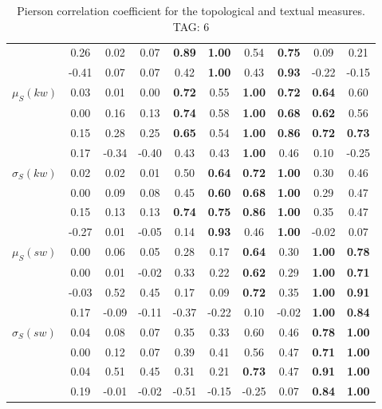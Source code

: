 \begin{table*}[h!]
\begin{center}
\begin{tabular}{| l || c | c | c | c | c | c | c | c | c |}
 & 0.26 & 0.02 & 0.07 & {\bf 0.89} & {\bf 1.00} & 0.54 & {\bf 0.75} & 0.09 & 0.21 \\
 & -0.41 & 0.07 & 0.07 & 0.42 & {\bf 1.00} & 0.43 & {\bf 0.93} & -0.22 & -0.15 \\\hline
$\mu_S(kw)$ & 0.03 & 0.01 & 0.00 & {\bf 0.72} & 0.55 & {\bf 1.00} & {\bf 0.72} & {\bf 0.64} & 0.60 \\
 & 0.00 & 0.16 & 0.13 & {\bf 0.74} & 0.58 & {\bf 1.00} & {\bf 0.68} & {\bf 0.62} & 0.56 \\
 & 0.15 & 0.28 & 0.25 & {\bf 0.65} & 0.54 & {\bf 1.00} & {\bf 0.86} & {\bf 0.72} & {\bf 0.73} \\
 & 0.17 & -0.34 & -0.40 & 0.43 & 0.43 & {\bf 1.00} & 0.46 & 0.10 & -0.25 \\\hline
$\sigma_S(kw)$ & 0.02 & 0.02 & 0.01 & 0.50 & {\bf 0.64} & {\bf 0.72} & {\bf 1.00} & 0.30 & 0.46 \\
 & 0.00 & 0.09 & 0.08 & 0.45 & {\bf 0.60} & {\bf 0.68} & {\bf 1.00} & 0.29 & 0.47 \\
 & 0.15 & 0.13 & 0.13 & {\bf 0.74} & {\bf 0.75} & {\bf 0.86} & {\bf 1.00} & 0.35 & 0.47 \\
 & -0.27 & 0.01 & -0.05 & 0.14 & {\bf 0.93} & 0.46 & {\bf 1.00} & -0.02 & 0.07 \\\hline
$\mu_S(sw)$ & 0.00 & 0.06 & 0.05 & 0.28 & 0.17 & {\bf 0.64} & 0.30 & {\bf 1.00} & {\bf 0.78} \\
 & 0.00 & 0.01 & -0.02 & 0.33 & 0.22 & {\bf 0.62} & 0.29 & {\bf 1.00} & {\bf 0.71} \\
 & -0.03 & 0.52 & 0.45 & 0.17 & 0.09 & {\bf 0.72} & 0.35 & {\bf 1.00} & {\bf 0.91} \\
 & 0.17 & -0.09 & -0.11 & -0.37 & -0.22 & 0.10 & -0.02 & {\bf 1.00} & {\bf 0.84} \\\hline
$\sigma_S(sw)$ & 0.04 & 0.08 & 0.07 & 0.35 & 0.33 & 0.60 & 0.46 & {\bf 0.78} & {\bf 1.00} \\
 & 0.00 & 0.12 & 0.07 & 0.39 & 0.41 & 0.56 & 0.47 & {\bf 0.71} & {\bf 1.00} \\
 & 0.04 & 0.51 & 0.45 & 0.31 & 0.21 & {\bf 0.73} & 0.47 & {\bf 0.91} & {\bf 1.00} \\
 & 0.19 & -0.01 & -0.02 & -0.51 & -0.15 & -0.25 & 0.07 & {\bf 0.84} & {\bf 1.00} \\\hline
\end{tabular}
\caption{Pierson correlation coefficient for the topological and textual measures. TAG: 6}
\end{center}
\end{table*}